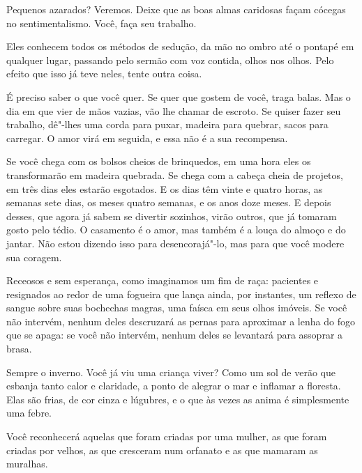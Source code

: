 \bigskip
\bigskip


Pequenos azarados? Veremos. Deixe que as boas almas caridosas façam
cócegas no sentimentalismo. Você, faça seu trabalho.

\bigskip
\bigskip


Eles conhecem todos os métodos de sedução, da mão no ombro até o pontapé
em qualquer lugar, passando pelo sermão com voz contida, olhos nos
olhos. Pelo efeito que isso já teve neles, tente outra coisa.

\bigskip
\bigskip


É preciso saber o que você quer. Se quer que gostem de você, traga
balas. Mas o dia em que vier de mãos vazias, vão lhe chamar de escroto.
Se quiser fazer seu trabalho, dê"-lhes uma corda para puxar, madeira para
quebrar, sacos para carregar. O amor virá em seguida, e essa não é a sua
recompensa.

\bigskip
\bigskip


Se você chega com os bolsos cheios de brinquedos, em uma hora eles os
transformarão em madeira quebrada. Se chega com a cabeça cheia de
projetos, em três dias eles estarão esgotados. E os dias têm vinte e
quatro horas, as semanas sete dias, os meses quatro semanas, e os anos
doze meses. E depois desses, que agora já sabem se divertir sozinhos,
virão outros, que já tomaram gosto pelo tédio. O casamento é o amor, mas
também é a louça do almoço e do jantar. Não estou dizendo isso para
desencorajá"-lo, mas para que você modere sua coragem.

\bigskip
\bigskip


Receosos e sem esperança, como imaginamos um fim de raça: pacientes e
resignados ao redor de uma fogueira que lança ainda, por instantes, um
reflexo de sangue sobre suas bochechas magras, uma faísca em seus olhos
imóveis. Se você não intervém, nenhum deles descruzará as pernas para
aproximar a lenha do fogo que se apaga: se você não intervém, nenhum
deles se levantará para assoprar a brasa.

\bigskip
\bigskip


Sempre o inverno. Você já viu uma criança viver? Como um sol de verão
que esbanja tanto calor e claridade, a ponto de alegrar o mar e inflamar
a floresta. Elas são frias, de cor cinza e lúgubres, e o que às vezes as
anima é simplesmente uma febre.

\bigskip
\bigskip

Você reconhecerá aquelas que foram criadas por uma mulher, as que foram
criadas por velhos, as que cresceram num orfanato e as que mamaram as
muralhas.

